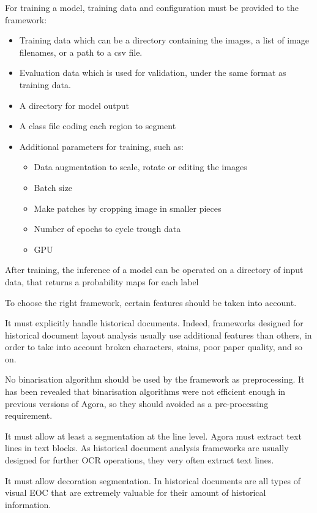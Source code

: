 \documentclass{polytech/polytech}
\numberwithin{figure}{chapter}
\begin{document}
For training a model, training data and configuration must be provided to the framework:
\begin{itemize}
\item Training data which can be a directory containing the images, a list of image filenames, or a path to a csv file.
\item Evaluation data which is used for validation, under the same format as training data.
\item A directory for model output
\item A class file coding each region to segment
\item Additional parameters for training, such as:
	\begin{itemize}
	\item Data augmentation to scale, rotate or editing the images
	\item Batch size
	\item Make patches by cropping image in smaller pieces
	\item Number of epochs to cycle trough data
	\item GPU
	\end{itemize}
\end{itemize}

After training, the inference of a model can be operated on a directory of input data, that returns a probability maps for each label


To choose the right framework, certain features should be taken into account.

It must explicitly handle historical documents.
Indeed, frameworks designed for historical document layout analysis usually use additional features than others, in order to take into account broken characters, stains, poor paper quality, and so on.

No binarisation algorithm should be used by the framework as preprocessing.
It has been revealed that binarisation algorithms were not efficient enough in previous versions of Agora, so they should avoided as a pre-processing requirement.

It must allow at least a segmentation at the line level.
Agora must extract text lines in text blocks.
As historical document analysis frameworks are usually designed for further OCR operations, they very often extract text lines.

It must allow decoration segmentation.
In historical documents are all types of visual EOC that are extremely valuable for their amount of historical information.
\end{document}
